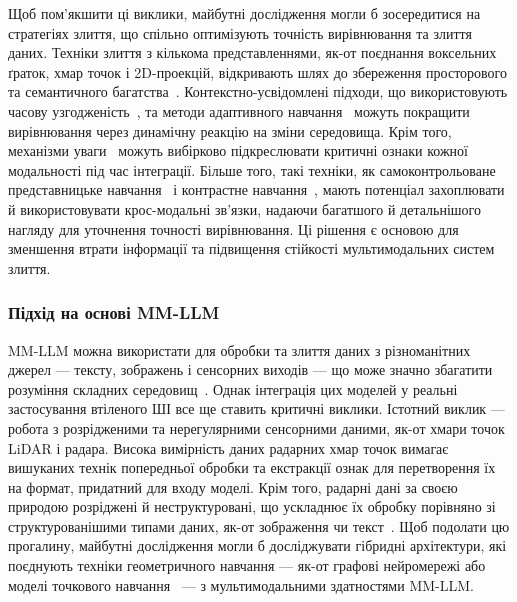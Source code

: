 Щоб пом'якшити ці виклики, майбутні дослідження могли б зосередитися на стратегіях злиття, що спільно оптимізують точність вирівнювання та злиття даних. Техніки злиття з кількома представленнями, як-от поєднання воксельних ґраток, хмар точок і 2D-проекцій, відкривають шлях до збереження просторового та семантичного багатства~\cite{xu2021voxel}. Контекстно-усвідомлені підходи, що використовують часову узгодженість~\cite{zhu2024temporally}, та методи адаптивного навчання~\cite{lubken2024adaptive} можуть покращити вирівнювання через динамічну реакцію на зміни середовища. Крім того, механізми уваги~\cite{vaswani2017attention} можуть вибірково підкреслювати критичні ознаки кожної модальності під час інтеграції.
Більше того, такі техніки, як самоконтрольоване представницьке навчання~\cite{ericsson2022self} і контрастне навчання~\cite{wickstrom2022mixing}, мають потенціал захоплювати й використовувати крос-модальні зв'язки, надаючи багатшого й детальнішого нагляду для уточнення точності вирівнювання.
Ці рішення є основою для зменшення втрати інформації та підвищення стійкості мультимодальних систем злиття.


\subsubsection{Підхід на основі MM-LLM}

MM-LLM можна використати для обробки та злиття даних з різноманітних джерел — тексту, зображень і сенсорних виходів — що може значно збагатити розуміння складних середовищ~\cite{ye2024mplug, tiantokenize}.
Однак інтеграція цих моделей у реальні застосування втіленого ШІ все ще ставить критичні виклики.
Істотний виклик — робота з розрідженими та нерегулярними сенсорними даними, як-от хмари точок LiDAR і радара.
Висока вимірність даних радарних хмар точок вимагає вишуканих технік попередньої обробки та екстракції ознак для перетворення їх на формат, придатний для входу моделі. Крім того, радарні дані за своєю природою розріджені й неструктуровані, що ускладнює їх обробку порівняно зі структурованішими типами даних, як-от зображення чи текст~\cite{schumann2021radarscenes, li2020deep}.
Щоб подолати цю прогалину, майбутні дослідження могли б досліджувати гібридні архітектури, які поєднують техніки геометричного навчання — як-от графові нейромережі або моделі точкового навчання~\cite{svenningsson2021radar,murray2024estimating} — з мультимодальними здатностями MM-LLM.

